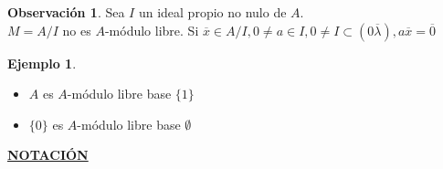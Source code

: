 \documentclass{article}
\theoremstyle{theorem-style}  %
\theoremstyle{definition}
\newtheorem*{observation}{Observación} %
\theoremstyle{example-style}
\newtheorem{example}{Ejemplo}[section]
\begin{document}
	\begin{observation}
		Sea $ I $ un ideal propio no nulo de $ A $.\\
		$ M=A/I $ no es $ A $-módulo libre.
		Si $ \overline{x} \in A/I, 0\neq a\in I, 0\neq I \subset (0\overline{\lambda}), a\overline{x}=\overline{0} $
	\end{observation}
	\begin{example}

		\begin{itemize}
			\item $ A $ es $ A $-módulo libre base $ \{1\} $
			\item $ \{0\} $ es $ A $-módulo libre base $ \emptyset $
		\end{itemize}
	\end{example}
	
	\underline{\textbf{NOTACIÓN}}
\end{document}
